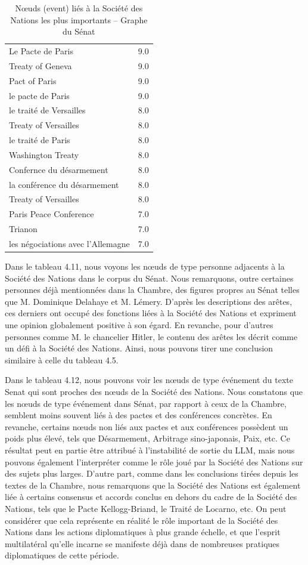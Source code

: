 \documentclass[a4paper,twoside,12pt]{book}
\begin{document}
\begin{table}[htbp]
\begin{tabular}{p{8cm}r}
Le Pacte de Paris & 9.0 \\
Treaty of Geneva & 9.0 \\
Pact of Paris & 9.0 \\
le pacte de Paris & 9.0 \\
le traité de Versailles & 8.0 \\
Treaty of Versailles & 8.0 \\
le traité de Paris & 8.0 \\
Washington Treaty & 8.0 \\
Confernce du désarmement & 8.0 \\
la conférence du désarmement & 8.0 \\
Treaty of Versailles  & 8.0 \\
Paris Peace Conference & 7.0 \\
Trianon & 7.0 \\
les négociations avec l'Allemagne & 7.0 \\
\hline
\end{tabular}
\caption{Nœuds (event) liés à la Société des Nations les plus importants – Graphe du Sénat}
\end{table}

Dans le tableau 4.11, nous voyons les nœuds de type personne adjacents à la Société des Nations dans le corpus du Sénat. Nous remarquons, outre certaines personnes déjà mentionnées dans la Chambre, des figures propres au Sénat telles que M. Dominique Delahaye et M. Lémery. D'après les descriptions des arêtes, ces derniers ont occupé des fonctions liées à la Société des Nations et expriment une opinion globalement positive à son égard. En revanche, pour d'autres personnes comme M. le chancelier Hitler, le contenu des arêtes les décrit comme un défi à la Société des Nations. Ainsi, nous pouvons tirer une conclusion similaire à celle du tableau 4.5.

Dans le tableau 4.12, nous pouvons voir les nœuds de type événement du texte Senat qui sont proches des nœuds de la Société des Nations. Nous constatons que les nœuds de type événement dans Sénat, par rapport à ceux de la Chambre, semblent moins souvent liés à des pactes et des conférences concrètes. En revanche, certains nœuds non liés aux pactes et aux conférences possèdent un poids plus élevé, tels que Désarmement, Arbitrage sino-japonais, Paix, etc. Ce résultat peut en partie être attribué à l'instabilité de sortie du LLM, mais nous pouvons également l'interpréter comme le rôle joué par la Société des Nations sur des sujets plus larges. D'autre part, comme dans les conclusions tirées depuis les textes de la Chambre, nous remarquons que la Société des Nations est également liée à certains consensus et accords conclus en dehors du cadre de la Société des Nations, tels que le Pacte Kellogg-Briand, le Traité de Locarno, etc. On peut considérer que cela représente en réalité le rôle important de la Société des Nations dans les actions diplomatiques à plus grande échelle, et que l'esprit multilatéral qu'elle incarne se manifeste déjà dans de nombreuses pratiques diplomatiques de cette période.
\end{document}
